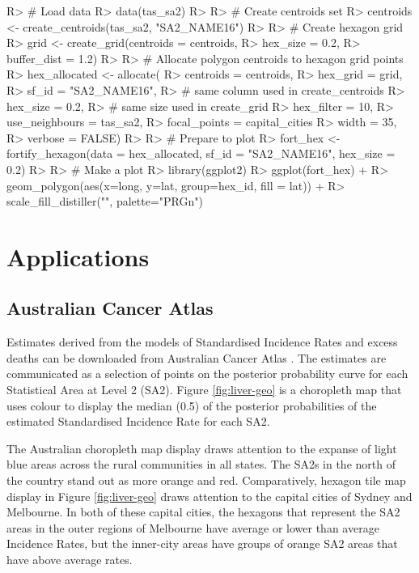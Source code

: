 \documentclass[
]{jss}
\begin{document}
\begin{CodeChunk}

\begin{CodeInput}
R> # Load data
R> data(tas_sa2)
R> 
R> # Create centroids set
R> centroids <- create_centroids(tas_sa2, "SA2_NAME16")
R> 
R> # Create hexagon grid
R> grid <- create_grid(centroids = centroids,
R>     hex_size = 0.2,
R>     buffer_dist = 1.2)
R> 
R> # Allocate polygon centroids to hexagon grid points
R> hex_allocated <- allocate(
R>   centroids = centroids,
R>   hex_grid = grid,
R>   sf_id = "SA2_NAME16",
R>   # same column used in create_centroids
R>   hex_size = 0.2,
R>   # same size used in create_grid
R>   hex_filter = 10,
R>   use_neighbours = tas_sa2,
R>   focal_points = capital_cities %
R>   width = 35,
R>   verbose = FALSE)
R> 
R> # Prepare to plot
R> fort_hex <- fortify_hexagon(data = hex_allocated, sf_id = "SA2_NAME16", hex_size = 0.2)
R> 
R> # Make a plot
R> library(ggplot2)
R> ggplot(fort_hex) + 
R>   geom_polygon(aes(x=long, y=lat, group=hex_id, fill = lat)) +
R>   scale_fill_distiller("", palette="PRGn")
\end{CodeInput}
\end{CodeChunk}

\hypertarget{applications}{%
\section{Applications}\label{applications}}

\hypertarget{australian-cancer-atlas}{%
\subsection{Australian Cancer Atlas}\label{australian-cancer-atlas}}

Estimates derived from the models of Standardised Incidence Rates and
excess deaths can be downloaded from Australian Cancer Atlas
\citep{atlas}. The estimates are communicated as a selection of points
on the posterior probability curve for each Statistical Area at Level 2
(SA2). Figure \ref{fig:liver-geo} is a choropleth map that uses colour
to display the median (0.5) of the posterior probabilities of the
estimated Standardised Incidence Rate for each SA2.

The Australian choropleth map display draws attention to the expanse of
light blue areas across the rural communities in all states. The SA2s in
the north of the country stand out as more orange and red.
Comparatively, hexagon tile map display in Figure \ref{fig:liver-geo}
draws attention to the capital cities of Sydney and Melbourne. In both
of these capital cities, the hexagons that represent the SA2 areas in
the outer regions of Melbourne have average or lower than average
Incidence Rates, but the inner-city areas have groups of orange SA2
areas that have above average rates.
\end{document}
